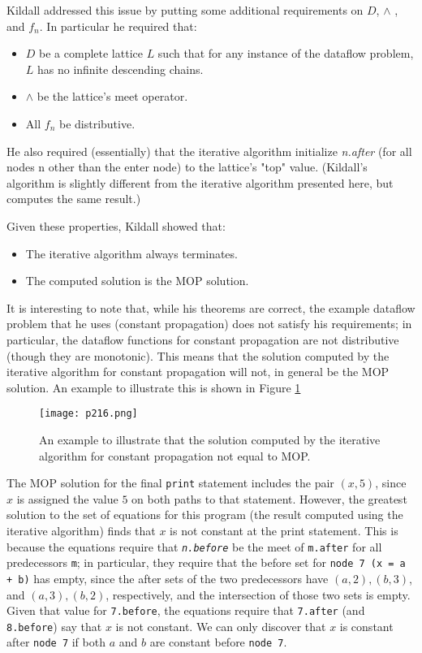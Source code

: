 Kildall addressed this issue by putting some additional requirements
on $D$, $\wedge$ , and $f_n$. In particular he required that:


\begin{itemize}
	\item  $D$ be a complete lattice $L$ such that for any instance of the dataflow problem, $L$ has no infinite descending chains.
	\item  $\wedge$ be the lattice's meet operator.
	\item  All $f_n$ be distributive.
\end{itemize}
He also required (essentially) that the iterative algorithm initialize \textit{n.after} (for all nodes n other than the enter node) to the lattice's "top" value. (Kildall's algorithm is slightly different from the iterative algorithm presented here, but computes the same result.)

Given these properties, Kildall showed that:
\begin{itemize}
	\item The iterative algorithm always terminates.
	\item The computed solution is the MOP solution.

\end{itemize}

It is interesting to note that, while his theorems are correct,
the example dataflow problem that he uses (constant propagation)
does not satisfy his requirements; in particular, the dataflow functions for
constant propagation are not distributive (though they are monotonic).
This means that the solution computed by the iterative algorithm for constant
propagation will not, in general be the MOP solution. An example to
illustrate this is shown in Figure \ref{fig:p216}


\begin{figure}[H]
	\centering
	\texttt{[image: p216.png]}
	\caption{An example to illustrate that the
		solution computed by the iterative algorithm for constant propagation not equal to MOP.}
	\label{fig:p216}
\end{figure}


The MOP solution for the final \texttt{print} statement includes the pair $(x,5)$,
since $x$ is assigned the value $5$ on both paths to that statement. However,
the greatest solution to the set of equations for this program (the result
computed using the iterative algorithm) finds that $x$ is not constant at the
print statement. This is because the equations require that \texttt{\textit{n.before}} be the
meet of \texttt{m.after} for all predecessors \texttt{m}; in particular, they require that
the {\color{red} before} set for  \texttt{node 7 (x = a + b)}
has empty, since the {\color{red} after} sets
of the two predecessors have $(a,2), (b,3)$, and $(a,3), (b,2)$, respectively,
and the intersection of those two sets is empty. Given that value for
\texttt{7.before}, the equations require that \texttt{7.after} (and \texttt{8.before}) say that
$x$ is not constant. We can only discover that $x$ is constant after \texttt{node 7}
if both $a$ and $b$ are constant before \texttt{node 7}.




